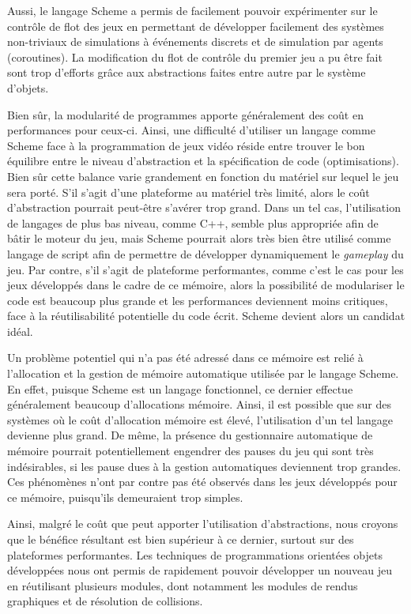 \documentclass[12pt,oneside,letterpaper,francais]{book}
\begin{document}
Aussi, le langage Scheme a permis de facilement pouvoir expérimenter
sur le contrôle de flot des jeux en permettant de développer
facilement des systèmes non-triviaux de simulations à événements
discrets et de simulation par agents (coroutines). La modification du
flot de contrôle du premier jeu a pu être fait sont trop d'efforts
grâce aux abstractions faites entre autre par le système d'objets.

Bien sûr, la modularité de programmes apporte généralement des coût en
performances pour ceux-ci. Ainsi, une difficulté d'utiliser un langage
comme Scheme face à la programmation de jeux vidéo réside entre
trouver le bon équilibre entre le niveau d'abstraction et la
spécification de code (optimisations). Bien sûr cette balance varie
grandement en fonction du matériel sur lequel le jeu sera porté. S'il
s'agit d'une plateforme au matériel très limité, alors le coût
d'abstraction pourrait peut-être s'avérer trop grand. Dans un tel cas,
l'utilisation de langages de plus bas niveau, comme C++, semble plus
appropriée afin de bâtir le moteur du jeu, mais Scheme pourrait alors
très bien être utilisé comme langage de script afin de permettre de
développer dynamiquement le \textit{gameplay} du jeu. Par contre, s'il
s'agit de plateforme performantes, comme c'est le cas pour les jeux
développés dans le cadre de ce mémoire, alors la possibilité de
modulariser le code est beaucoup plus grande et les performances
deviennent moins critiques, face à la réutilisabilité potentielle du
code écrit. Scheme devient alors un candidat idéal.

Un problème potentiel qui n'a pas été adressé dans ce mémoire est
relié à l'allocation et la gestion de mémoire automatique utilisée par
le langage Scheme. En effet, puisque Scheme est un langage
fonctionnel, ce dernier effectue généralement beaucoup d'allocations
mémoire. Ainsi, il est possible que sur des systèmes où le coût
d'allocation mémoire est élevé, l'utilisation d'un tel langage
devienne plus grand. De même, la présence du gestionnaire automatique
de mémoire pourrait potentiellement engendrer des pauses du jeu qui
sont très indésirables, si les pause dues à la gestion automatiques
deviennent trop grandes. Ces phénomènes n'ont par contre pas été
observés dans les jeux développés pour ce mémoire, puisqu'ils
demeuraient trop simples.

Ainsi, malgré le coût que peut apporter l'utilisation d'abstractions,
nous croyons que le bénéfice résultant est bien supérieur à ce
dernier, surtout sur des plateformes performantes. Les techniques de
programmations orientées objets développées nous ont permis de
rapidement pouvoir développer un nouveau jeu en réutilisant plusieurs
modules, dont notamment les modules de rendus graphiques et de
résolution de collisions.
\end{document}
